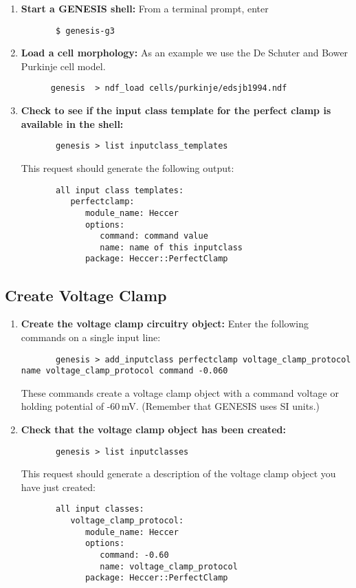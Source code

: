 \documentclass[12pt]{article}
\begin{document}
\begin{enumerate}
	\item{\bf Start a GENESIS shell:} From a terminal prompt, enter
	\begin{verbatim}
	   $ genesis-g3
	\end{verbatim}
	
	\item{\bf Load a cell morphology:} As an example we use the De Schuter and Bower Purkinje cell model.
	\begin{verbatim}
	  genesis  > ndf_load cells/purkinje/edsjb1994.ndf
	\end{verbatim}
	
	\item{\bf Check to see if the input class template for the perfect clamp is available in the shell:}
	\begin{verbatim}
	   genesis > list inputclass_templates
	\end{verbatim}
	This request should generate the following output:
	\begin{verbatim}
	   all input class templates: 
	      perfectclamp:
	         module_name: Heccer
	         options:
	            command: command value
	            name: name of this inputclass
	         package: Heccer::PerfectClamp
	\end{verbatim}	
\end{enumerate}

\subsection*{Create Voltage Clamp}

\begin{enumerate}

	\item{\bf Create the voltage clamp circuitry object:} Enter the following commands on a single input line:
	\begin{verbatim}
	   genesis > add_inputclass perfectclamp voltage_clamp_protocol name voltage_clamp_protocol command -0.060
	\end{verbatim}
	These commands create a voltage clamp object with a command voltage or holding potential of -60\,mV. (Remember that GENESIS uses SI units.)
	
	\item{\bf Check that the voltage clamp object has been created:}
	\begin{verbatim}
	   genesis > list inputclasses
	\end{verbatim}
	This request should generate a description of the voltage clamp object you have just created:
	\begin{verbatim}
	   all input classes: 
	      voltage_clamp_protocol:
	         module_name: Heccer
	         options:
	            command: -0.60
	            name: voltage_clamp_protocol
	         package: Heccer::PerfectClamp
	\end{verbatim}
\end{enumerate}
\end{document}
